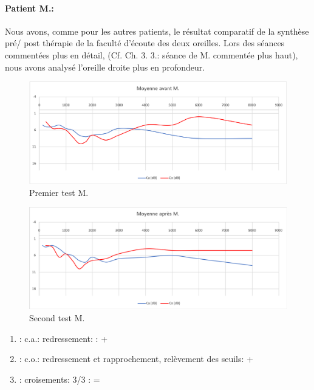          \paragraph{ Patient M.:}
       
       Nous avons, comme pour les autres patients, le résultat comparatif de la synthèse pré/ post thérapie 
       de la faculté d'écoute des deux oreilles. Lors des séances commentées plus en détail, (Cf. Ch. 3. 3.: 
       séance de M. commentée plus haut), nous avons analysé l'oreille droite plus en profondeur.
       
                      \begin{figure}[h]
       	\centering
       	\includegraphics[width=0.7\linewidth]{images/graphiques/m_pre.png}
       	
       	\caption[Patient M. : 1° test]{Premier test M.}
       	
       \end{figure}
       
       
       \begin{figure}[h]
       	\centering
       	\includegraphics[width=0.7\linewidth]{images/graphiques/m_post.png}
       	\caption[Patient M. : 2° test]{Second test M.}
       	
       \end{figure}
       
	\begin{enumerate}

 		\item : c.a.: redressement: : +   %

 		\item : c.o.: redressement et rapprochement,
                  relèvement des seuils:  +     %
 		\item : croisements: 3/3 :  =

                \end{enumerate}

